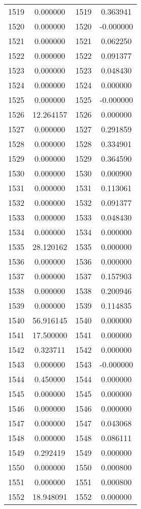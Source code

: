 \documentclass[12pt]{article}
\begin{document}
\begin{longtable}{@{}cccc@{}}
1519 & 0.000000 & 1519 & 0.363941 \\
1520 & 0.000000 & 1520 & -0.000000 \\
1521 & 0.000000 & 1521 & 0.062250 \\
1522 & 0.000000 & 1522 & 0.091377 \\
1523 & 0.000000 & 1523 & 0.048430 \\
1524 & 0.000000 & 1524 & 0.000000 \\
1525 & 0.000000 & 1525 & -0.000000 \\
1526 & 12.264157 & 1526 & 0.000000 \\
1527 & 0.000000 & 1527 & 0.291859 \\
1528 & 0.000000 & 1528 & 0.334901 \\
1529 & 0.000000 & 1529 & 0.364590 \\
1530 & 0.000000 & 1530 & 0.000900 \\
1531 & 0.000000 & 1531 & 0.113061 \\
1532 & 0.000000 & 1532 & 0.091377 \\
1533 & 0.000000 & 1533 & 0.048430 \\
1534 & 0.000000 & 1534 & 0.000000 \\
1535 & 28.120162 & 1535 & 0.000000 \\
1536 & 0.000000 & 1536 & 0.000000 \\
1537 & 0.000000 & 1537 & 0.157903 \\
1538 & 0.000000 & 1538 & 0.200946 \\
1539 & 0.000000 & 1539 & 0.114835 \\
1540 & 56.916145 & 1540 & 0.000000 \\
1541 & 17.500000 & 1541 & 0.000000 \\
1542 & 0.323711 & 1542 & 0.000000 \\
1543 & 0.000000 & 1543 & -0.000000 \\
1544 & 0.450000 & 1544 & 0.000000 \\
1545 & 0.000000 & 1545 & 0.000000 \\
1546 & 0.000000 & 1546 & 0.000000 \\
1547 & 0.000000 & 1547 & 0.043068 \\
1548 & 0.000000 & 1548 & 0.086111 \\
1549 & 0.292419 & 1549 & 0.000000 \\
1550 & 0.000000 & 1550 & 0.000800 \\
1551 & 0.000000 & 1551 & 0.000800 \\
1552 & 18.948091 & 1552 & 0.000000 \\

\end{longtable}
\end{document}
